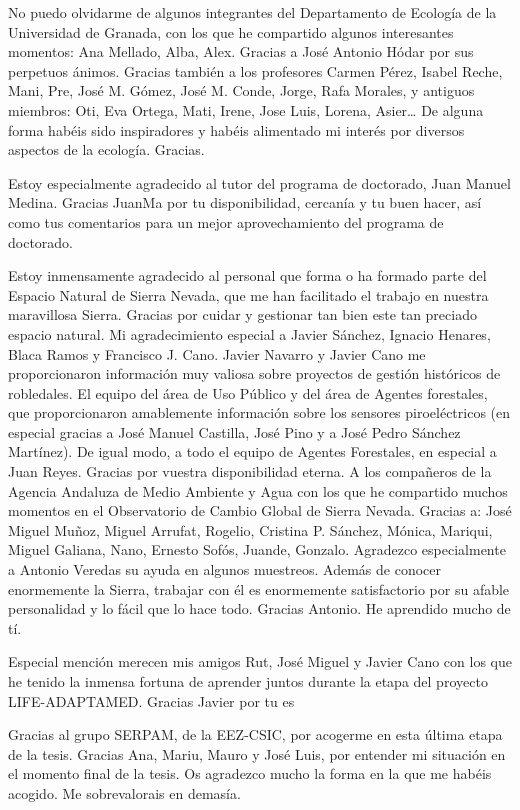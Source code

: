 No puedo olvidarme de algunos integrantes del Departamento de Ecología de la Universidad de Granada, con los que he compartido algunos interesantes momentos: Ana Mellado, Alba, Alex. Gracias a José Antonio Hódar por sus perpetuos ánimos. Gracias también a los profesores Carmen Pérez, Isabel Reche, Mani, Pre, José M. Gómez, José M. Conde, Jorge, Rafa Morales, y antiguos miembros: Oti, Eva Ortega, Mati, Irene, Jose Luis, Lorena, Asier… De alguna forma habéis sido inspiradores y habéis alimentado mi interés por diversos aspectos de la ecología. Gracias. 

Estoy especialmente agradecido al tutor del programa de doctorado, Juan Manuel Medina. Gracias JuanMa por tu disponibilidad, cercanía y tu buen hacer, así como tus comentarios para un mejor aprovechamiento del programa de doctorado. 

Estoy inmensamente agradecido al personal que forma o ha formado parte del Espacio Natural de Sierra Nevada, que me han facilitado el trabajo en nuestra maravillosa Sierra. Gracias por cuidar y gestionar tan bien este tan preciado espacio natural. Mi agradecimiento especial a Javier Sánchez, Ignacio Henares, Blaca Ramos y Francisco J. Cano. Javier Navarro y Javier Cano me proporcionaron información muy valiosa sobre proyectos de gestión históricos de robledales. El equipo del área de Uso Público y del área de Agentes forestales, que proporcionaron amablemente información sobre los sensores piroeléctricos (en especial gracias a José Manuel Castilla, José Pino y a José Pedro Sánchez Martínez). De igual modo, a todo el equipo de Agentes Forestales, en especial a Juan Reyes. Gracias por vuestra disponibilidad eterna. A los compañeros de la Agencia Andaluza de Medio Ambiente y Agua con los que he compartido muchos momentos en el Observatorio de Cambio Global de Sierra Nevada. Gracias a: José Miguel Muñoz, Miguel Arrufat, Rogelio, Cristina P. Sánchez, Mónica, Mariqui, Miguel Galiana, Nano, Ernesto Sofós, Juande, Gonzalo. Agradezco especialmente a Antonio Veredas su ayuda en algunos muestreos. Además de conocer enormemente la Sierra, trabajar con él es enormemente satisfactorio por su afable personalidad y lo fácil que lo hace todo. Gracias Antonio. He aprendido mucho de tí. 

Especial mención merecen mis amigos Rut, José Miguel y Javier Cano con los que he tenido la inmensa fortuna de aprender juntos durante la etapa del proyecto LIFE-ADAPTAMED. Gracias Javier por tu es

Gracias al grupo SERPAM, de la EEZ-CSIC, por acogerme en esta última etapa de la tesis. Gracias Ana, Mariu, Mauro y José Luis, por entender mi situación en el momento final de la tesis. Os agradezco mucho la forma en la que me habéis acogido. Me sobrevalorais en demasía. 

